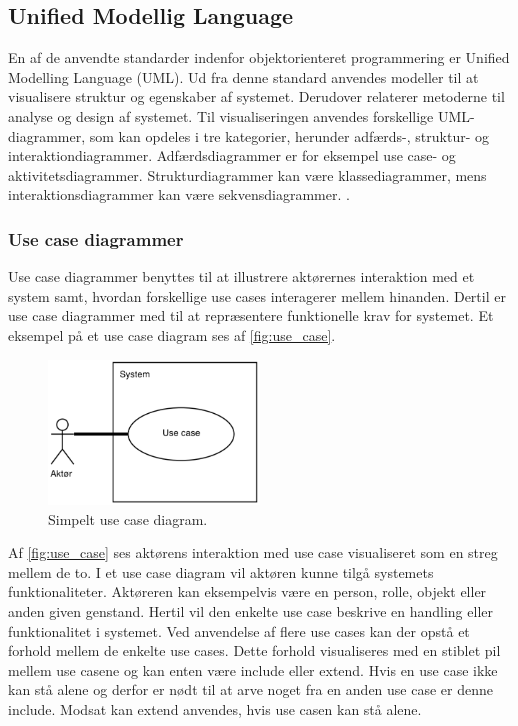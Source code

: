 \subsection{Unified Modellig Language}
En af de anvendte standarder indenfor objektorienteret programmering er Unified Modelling Language (UML). Ud fra denne standard anvendes modeller til at visualisere struktur og egenskaber af systemet. Derudover relaterer metoderne til analyse og design af systemet. Til visualiseringen anvendes forskellige UML-diagrammer, som kan opdeles i tre kategorier, herunder adfærds-, struktur- og interaktiondiagrammer. Adfærdsdiagrammer er for eksempel use case- og  aktivitetsdiagrammer. Strukturdiagrammer kan være klassediagrammer, mens interaktionsdiagrammer kan være sekvensdiagrammer. \cite{Fowler2004, Williams2004}.


\subsubsection{Use case diagrammer} 
Use case diagrammer benyttes til at illustrere aktørernes interaktion med et system samt, hvordan forskellige use cases interagerer mellem hinanden. Dertil er use case diagrammer med til at repræsentere funktionelle krav for systemet. \cite{Williams2004} Et eksempel på et use case diagram ses af \autoref{fig:use_case}.

\begin{figure} [H]
\centering
\includegraphics[width=0.5\textwidth]{figures/USE_CASE2}
\caption{Simpelt use case diagram.}
\label{fig:use_case}
\end{figure}

\noindent
Af \autoref{fig:use_case} ses aktørens interaktion med use case visualiseret som en streg mellem de to. I et use case diagram vil aktøren kunne tilgå systemets funktionaliteter. Aktøreren kan eksempelvis være en person, rolle, objekt eller anden given genstand. Hertil vil den enkelte use case beskrive en handling eller funktionalitet i systemet. Ved anvendelse af flere use cases kan der opstå et forhold mellem de enkelte use cases. Dette forhold visualiseres med en stiblet pil mellem use casene og kan enten være include eller extend. Hvis en use case ikke kan stå alene og derfor er nødt til at arve noget fra en anden use case er denne include. Modsat kan extend anvendes, hvis use casen kan stå alene. \cite{Fowler2004, Williams2004}



